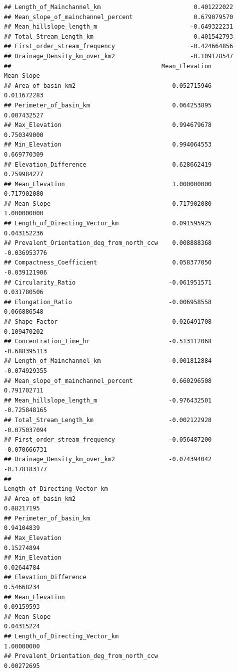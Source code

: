 \documentclass[11pt,]{article}
\begin{document}
\begin{verbatim}
## Length_of_Mainchannel_km                          0.401222022
## Mean_slope_of_mainchannel_percent                 0.679079570
## Mean_hillslope_length_m                          -0.649322231
## Total_Stream_Length_km                            0.401542793
## First_order_stream_frequency                     -0.424664856
## Drainage_Density_km_over_km2                     -0.109178547
##                                          Mean_Elevation   Mean_Slope
## Area_of_basin_km2                           0.052715946  0.011672283
## Perimeter_of_basin_km                       0.064253895  0.007432527
## Max_Elevation                               0.994679678  0.750349000
## Min_Elevation                               0.994064553  0.669770309
## Elevation_Difference                        0.628662419  0.759984277
## Mean_Elevation                              1.000000000  0.717902080
## Mean_Slope                                  0.717902080  1.000000000
## Length_of_Directing_Vector_km               0.091595925  0.043152236
## Prevalent_Orientation_deg_from_north_ccw    0.008888368 -0.036953776
## Compactness_Coefficient                     0.058377050 -0.039121906
## Circularity_Ratio                          -0.061951571  0.031780506
## Elongation_Ratio                           -0.006958558  0.066886548
## Shape_Factor                                0.026491708  0.109470202
## Concentration_Time_hr                      -0.513112068 -0.688395113
## Length_of_Mainchannel_km                   -0.001812884 -0.074929355
## Mean_slope_of_mainchannel_percent           0.660296508  0.791702711
## Mean_hillslope_length_m                    -0.976432501 -0.725848165
## Total_Stream_Length_km                     -0.002122928 -0.075037094
## First_order_stream_frequency               -0.056487200 -0.070666731
## Drainage_Density_km_over_km2               -0.074394042 -0.178183177
##                                          Length_of_Directing_Vector_km
## Area_of_basin_km2                                           0.88217195
## Perimeter_of_basin_km                                       0.94104839
## Max_Elevation                                               0.15274894
## Min_Elevation                                               0.02644784
## Elevation_Difference                                        0.54668234
## Mean_Elevation                                              0.09159593
## Mean_Slope                                                  0.04315224
## Length_of_Directing_Vector_km                               1.00000000
## Prevalent_Orientation_deg_from_north_ccw                    0.00272695

\end{verbatim}
\end{document}
